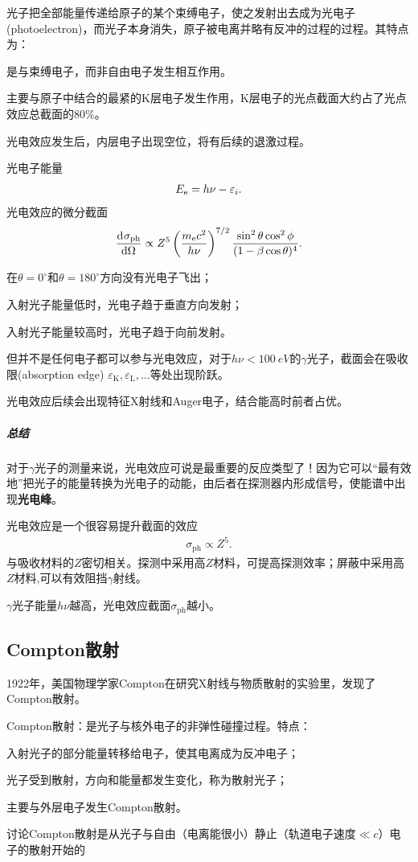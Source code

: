 光子把全部能量传递给原子的某个束缚电子，使之发射出去成为光电子(photoelectron)，而光子本身消失，原子被电离并略有反冲的过程的过程。其特点为：
\begin{compactenum}
	\item 是与束缚电子，而非自由电子发生相互作用。
	\item 主要与原子中结合的最紧的K层电子发生作用，K层电子的光点截面大约占了光点效应总截面的80\%。
	\item 光电效应发生后，内层电子出现空位，将有后续的退激过程。
\end{compactenum}
光电子能量 
\[
	E_\mathrm e=h\nu-\varepsilon_i.
\]
光电效应的微分截面
\[
	\frac{\mathrm{d}^{{}}\sigma_{\mathrm{ph}}}{\mathrm{d}{\Omega}^{{}}}\propto Z^5\left(\frac{m_\mathrm e c^2}{h\nu}\right)^{7/2}\frac{\sin^2\theta\cos^2\phi}{(1-\beta\cos\theta)^4}.
\]
\begin{compactenum}
	\item 在$\theta=0^\circ$和$\theta=180^\circ$方向没有光电子飞出；
	\item 入射光子能量低时，光电子趋于垂直方向发射；
	\item 入射光子能量较高时，光电子趋于向前发射。
\end{compactenum}

但并不是任何电子都可以参与光电效应，对于$h\nu<\SI{100}{eV}$的$\gamma$光子，截面会在吸收限(absorption edge) $\varepsilon_\mathrm K,\varepsilon_\mathrm L,\ldots$等处出现阶跃。

光电效应后续会出现特征X射线和Auger电子，结合能高时前者占优。

\subparagraph{总结}
对于$\gamma$光子的测量来说，光电效应可说是最重要的反应类型了！因为它可以“最有效地”把光子的能量转换为光电子的动能，由后者在探测器内形成信号，使能谱中出现\textbf{光电峰}。

光电效应是一个很容易提升截面的效应
\begin{align}
	\sigma_{\mathrm{ph}}\propto Z^5.
\end{align}
与吸收材料的$Z$密切相关。探测中采用高$Z$材料，可提高探测效率；屏蔽中采用高$Z$材料,可以有效阻挡$\gamma$射线。

$\gamma$光子能量$h\nu$越高，光电效应截面$\sigma_{\mathrm{ph}}$越小。

\subsection{Compton散射}

1922年，美国物理学家Compton在研究X射线与物质散射的实验里，发现了Compton散射。

Compton散射：是光子与核外电子的非弹性碰撞过程。特点：
\begin{compactenum}
	\item 入射光子的部分能量转移给电子，使其电离成为反冲电子；
	\item 光子受到散射，方向和能量都发生变化，称为散射光子；
	\item 主要与外层电子发生Compton散射。
\end{compactenum}
讨论Compton散射是从光子与自由（电离能很小）静止（轨道电子速度$\ll c$）电子的散射开始的

